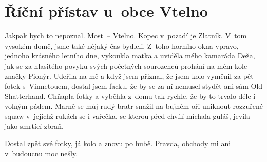 
\chapter{Říční přístav u~obce Vtelno}

Jakpak bych to nepoznal. Most~-- Vtelno. Kopec v~pozadí je Zlatník.
V~tom vysokém domě, jsme také nějaký čas bydleli. Z~toho horního okna
vpravo, jednoho krásného letního dne, vykoukla matka a uviděla mého
kamaráda Deža, jak se za hlasitého povyku svých početných sourozenců
prohání na mém kole značky Pionýr. Udeřila na mě a když jsem přiznal,
že jsem kolo vyměnil za pět fotek s~Vinnetouem, dostal jsem facku, že
by se za ní nemusel stydět ani sám Old Shatterhand. Chňapla fotky a
vyběhla z~domu tak rychle, že by to trvalo déle i volným pádem. Marně
se můj rudý bratr snažil na bujném oři uniknout rozzuřené squaw
v~jejíchž rukách se i vařečka, se kterou před chvílí míchala guláš,
jevila jako smrtící zbraň.

Dostal zpět své fotky, já kolo a znovu po hubě. Pravda, obchody mi ani
v~budoucnu moc nešly.

